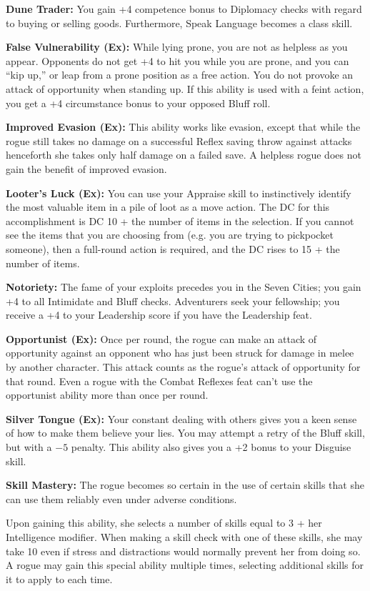 \textbf{Dune Trader:} You gain +4 competence bonus to Diplomacy checks with regard to buying or selling goods. Furthermore, Speak Language becomes a class skill.

\textbf{False Vulnerability (Ex):} While lying prone, you are not as helpless as you appear. Opponents do not get +4 to hit you while you are prone, and you can “kip up,” or leap from a prone position as a free action. You do not provoke an attack of opportunity when standing up. If this ability is used with a feint action, you get a +4 circumstance bonus to your opposed Bluff roll.

\textbf{Improved Evasion (Ex):} This ability works like evasion, except that while the rogue still takes no damage on a successful Reflex saving throw against attacks henceforth she takes only half damage on a failed save. A helpless rogue does not gain the benefit of improved evasion.

\textbf{Looter’s Luck (Ex):} You can use your Appraise skill to instinctively identify the most valuable item in a pile of loot as a move action. The DC for this accomplishment is DC 10 + the number of items in the selection. If you cannot see the items that you are choosing from (e.g. you are trying to pickpocket someone), then a full-round action is required, and the DC rises to 15 + the number of items.

\textbf{Notoriety:} The fame of your exploits precedes you in the Seven Cities; you gain +4 to all Intimidate and Bluff checks. Adventurers seek your fellowship; you receive a +4 to your Leadership score if you have the Leadership feat.

\textbf{Opportunist (Ex):} Once per round, the rogue can make an attack of opportunity against an opponent who has just been struck for damage in melee by another character. This attack counts as the rogue’s attack of opportunity for that round. Even a rogue with the Combat Reflexes feat can’t use the opportunist ability more than once per round.

\textbf{Silver Tongue (Ex):} Your constant dealing with others gives you a keen sense of how to make them believe your lies. You may attempt a retry of the Bluff skill, but with a $-5$ penalty. This ability also gives you a +2 bonus to your Disguise skill.

\textbf{Skill Mastery:} The rogue becomes so certain in the use of certain skills that she can use them reliably even under adverse conditions.

Upon gaining this ability, she selects a number of skills equal to 3 + her Intelligence modifier. When making a skill check with one of these skills, she may take 10 even if stress and distractions would normally prevent her from doing so. A rogue may gain this special ability multiple times, selecting additional skills for it to apply to each time.

